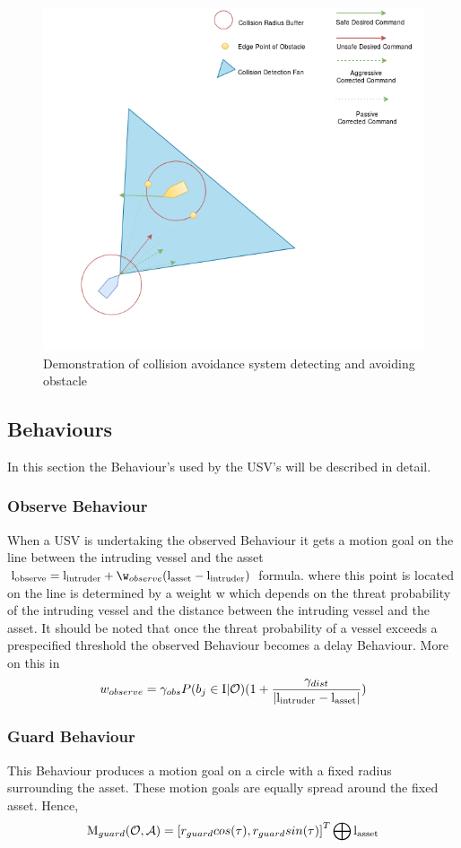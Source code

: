 \documentclass[bsc,frontabs,twoside,singlespacing,parskip,deptreport]{infthesis}     %
\begin{document}
\begin{figure}
    \centering
    \includegraphics[width=0.8\linewidth]{report/images/corrected_command.png}
    \caption{Demonstration of collision avoidance system detecting and avoiding obstacle}
    \label{fig:ca}
\end{figure}

\subsection{Behaviours}
\label{sec:behaviours}
In this section the Behaviour's used by the USV's will be described in detail.
\subsubsection{Observe Behaviour}
\label{ss:beh:observe}
When a USV is undertaking the observed Behaviour it gets a motion goal on the line between the intruding vessel and the asset $\agentlocation{observe} = \agentlocation{intruder} + \w_{observe}(\agentlocation{asset}-\agentlocation{intruder})$ formula. where this point is located on the line is determined by a weight w which depends on the threat probability of the intruding vessel and the distance between the intruding vessel and the asset. It should be noted that once the threat probability of a vessel exceeds a prespecified threshold the observed Behaviour becomes a delay Behaviour. More on this in %
$$w_{observe} = \gamma_{obs}P(b_{j} \in \mathrm{I}|\mathcal{O})(1+\frac{\gamma_{dist}}{|\mathrm{l_{intruder}}-\mathrm{l_{asset}}|})$$

\subsubsection{Guard Behaviour}
\label{ss:beh:guard}
This Behaviour produces a motion goal on a circle with a fixed radius surrounding the asset. These motion goals are equally spread around the fixed asset. Hence,
$$\mathrm{M}_{guard}(\mathcal{O}, \mathcal{A}) = \left[r_{guard}cos(\tau), r_{guard}sin(\tau)\right]^T \bigoplus \mathrm{l_{asset}}$$
\end{document}
